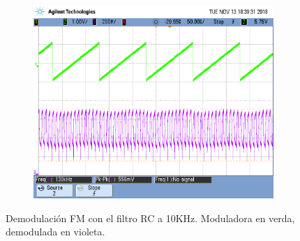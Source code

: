 \documentclass[../../tc_tp6_main.tex]{subfiles}
\begin{document}
\begin{figure}[H]
\begin{subfigure}[t]{0.45\textwidth}
		\centering
		\includegraphics[width=\textwidth]{figures/scope_33.png}
		\caption{}
	\end{subfigure}
	\caption{Demodulaci\'on FM con el filtro RC a 10KHz. Moduladora en verda, demodulada en violeta.}
	\label{fig:fm_rc_10k}
\end{figure}
\end{document}

